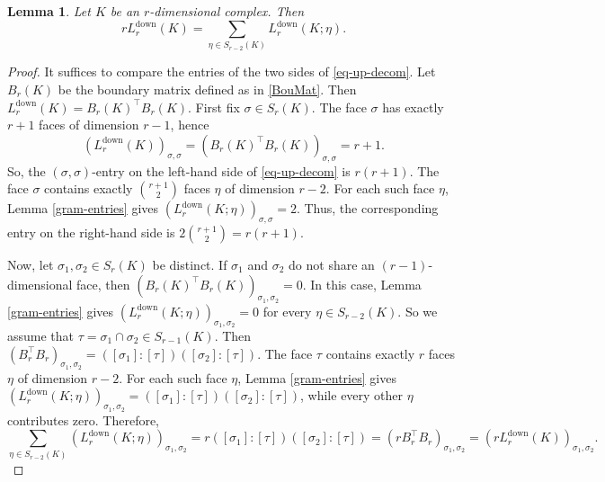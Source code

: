 \documentclass[12pt]{amsart}
\theoremstyle{plain}
\newtheorem{lem}[thm]{Lemma}
\theoremstyle{definition}
\numberwithin{equation}{section}
\numberwithin{figure}{section}
\newcommand{\Ldown}{L^{\operatorname{down}}}
\begin{document}
\begin{lem}\label{up-decom}
Let $K$ be an $r$-dimensional complex. 
Then
\begin{equation}\label{eq-up-decom}
r \Ldown_r(K) = \sum_{\eta \in S_{r - 2}(K)} \Ldown_r(K; \eta).
\end{equation}
\end{lem}

\begin{proof}
It suffices to compare the entries of the two sides of \eqref{eq-up-decom}.
Let $B_r(K)$ be the boundary matrix defined as in \eqref{BouMat}.
Then $\Ldown_r(K)=B_r(K)^\top B_r(K)$.
First fix $\sigma \in S_r(K)$.
The face $\sigma$ has exactly $r + 1$ faces of dimension $r - 1$, hence 
$$(\Ldown_r(K))_{\sigma,\sigma}=(B_r(K)^\top B_r(K))_{\sigma,\sigma} = r + 1.$$
So, the $(\sigma,\sigma)$-entry on the left-hand side of \eqref{eq-up-decom} is $r(r + 1)$.
The face $\sigma$ contains exactly $\binom{r + 1}{2}$ faces $\eta$ of dimension $r - 2$.
For each such face $\eta$, Lemma \ref{gram-entries} gives $(\Ldown_r(K; \eta))_{\sigma,\sigma} = 2$.
Thus, the corresponding entry on the right-hand side is $2\binom{r + 1}{2} = r(r + 1)$.

Now, let $\sigma_1,\sigma_2 \in S_r(K)$ be distinct.
If $\sigma_1$ and $\sigma_2$ do not share an $(r - 1)$-dimensional face, then $(B_r(K)^\top B_r(K))_{\sigma_1,\sigma_2} = 0$.
In this case, Lemma \ref{gram-entries} gives $(\Ldown_r(K; \eta))_{\sigma_1,\sigma_2} = 0$ for every $\eta \in S_{r - 2}(K)$.
So we assume that $\tau = \sigma_1 \cap \sigma_2 \in S_{r - 1}(K)$.
Then $(B_r^\top B_r)_{\sigma_1,\sigma_2} = ([\sigma_1] : [\tau])([\sigma_2] : [\tau])$.
The face $\tau$ contains exactly $r$ faces $\eta$ of dimension $r - 2$.
For each such face $\eta$, Lemma \ref{gram-entries} gives $(\Ldown_r(K; \eta))_{\sigma_1,\sigma_2} = ([\sigma_1] : [\tau])([\sigma_2] : [\tau])$, while every other $\eta$ contributes zero.
Therefore,
\[
\sum_{\eta \in S_{r - 2}(K)}
(\Ldown_r(K; \eta))_{\sigma_1,\sigma_2}
=
r([\sigma_1] : [\tau])([\sigma_2] : [\tau])
=
(rB_r^\top B_r)_{\sigma_1,\sigma_2}=(r\Ldown_r(K))_{\sigma_1,\sigma_2}.
\]
\end{proof}
\end{document}
